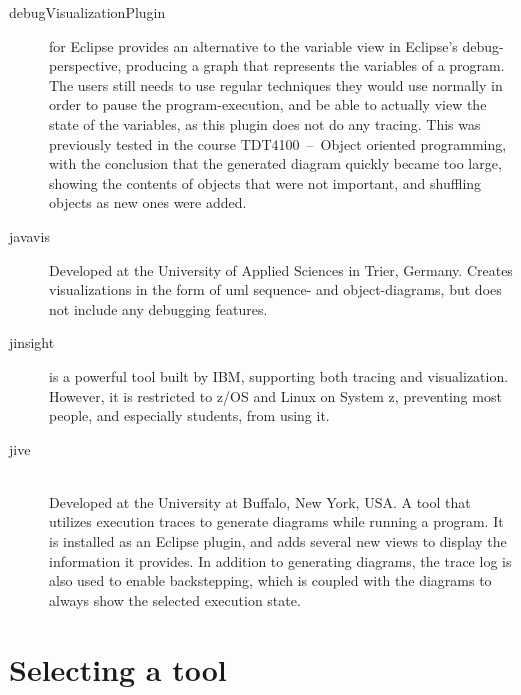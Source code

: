 \begin{description}
\item[\gls{debugVisualizationPlugin}] for Eclipse provides an alternative to the variable view in Eclipse's debug-perspective, producing a graph that represents the variables of a program.
The users still needs to use regular techniques they would use normally in order to pause the program-execution, and be able to actually view the state of the variables, as this plugin does not do any tracing.
This was previously tested in the course TDT4100~--~Object oriented programming, with the conclusion that the generated diagram quickly became too large, showing the contents of objects that were not important, and shuffling objects as new ones were added.%

\item[\Gls{javavis}] \cite{Oechsle2002} Developed at the University of Applied Sciences in Trier, Germany.
Creates visualizations in the form of \gls{uml} sequence- and object-diagrams, but does not include any debugging features.

\item[\Gls{jinsight}] \cite{Pauw} is a powerful tool built by IBM, supporting both tracing and visualization.
However, it is restricted to z/OS and Linux on System z, preventing most people, and especially students, from using it.

\item[\gls{jive}] \cite{Lessaa}\\
Developed at the University at Buffalo, New York, USA.
A tool that utilizes execution traces to generate diagrams while running a program.
It is installed as an Eclipse plugin, and adds several new views to display the information it provides.
In addition to generating diagrams, the trace log is also used to enable backstepping, which is coupled with the diagrams to always show the selected execution state.

\end{description}
\section{Selecting a tool}\label{preDiscuss}

